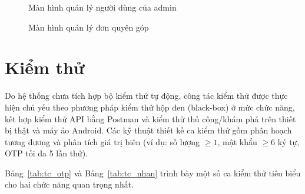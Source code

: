 \documentclass[../main.tex]{subfiles}%
\begin{document}
\begin{figure}[H]
    \centering
    \caption{Màn hình quản lý người dùng của admin}
    \label{fig:quan_ly_user}
\end{figure}

\begin{figure}[H]
    \centering
    \caption{Màn hình quản lý đơn quyên góp}
    \label{fig:quan_ly_donation}
\end{figure}

\section{Kiểm thử}
\label{section:4.4}

Do hệ thống chưa tích hợp bộ kiểm thử tự động, công tác kiểm thử được thực hiện chủ yếu theo phương pháp kiểm thử hộp đen (black-box) ở mức chức năng, kết hợp kiểm thử API bằng Postman và kiểm thử thủ công/khám phá trên thiết bị thật và máy ảo Android. Các kỹ thuật thiết kế ca kiểm thử gồm phân hoạch tương đương và phân tích giá trị biên (ví dụ: số lượng $\ge 1$, mật khẩu $\ge 6$ ký tự, OTP tối đa 5 lần thử).

Bảng~\ref{tab:tc_otp} và Bảng~\ref{tab:tc_nhan} trình bày một số ca kiểm thử tiêu biểu cho hai chức năng quan trọng nhất.

\begin{table}[H]
\centering
\renewcommand{\arraystretch}{1.25}
\caption{Ca kiểm thử chức năng ``Đăng ký \& xác minh OTP''}
\label{tab:tc_otp}
\end{table}
\end{document}

